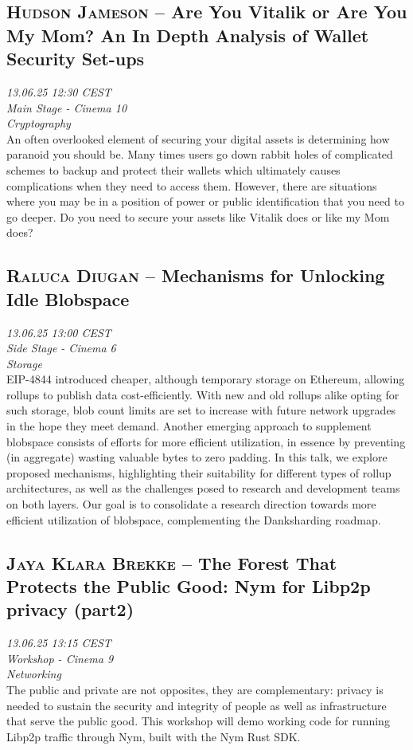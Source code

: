 \subsection {\textsc{Hudson Jameson}  -- Are You Vitalik or Are You My Mom? An In Depth Analysis of Wallet Security Set-ups} \noindent \textit {13.06.25 12:30 CEST\\ Main Stage - Cinema 10\\ Cryptography}\\[1em] An often overlooked element of securing your digital assets is determining how paranoid you should be. Many times users go down rabbit holes of complicated schemes to backup and protect their wallets which ultimately causes complications when they need to access them. However, there are situations where you may be in a position of power or public identification that you need to go deeper. Do you need to secure your assets like Vitalik does or like my Mom does?

\clearpage
\subsection {\textsc{Raluca Diugan}  -- Mechanisms for Unlocking Idle Blobspace} \noindent \textit {13.06.25 13:00 CEST\\ Side Stage - Cinema 6\\ Storage}\\[1em] EIP-4844 introduced cheaper, although temporary storage on Ethereum, allowing rollups to publish data cost-efficiently. With new and old rollups alike opting for such storage, blob count limits are set to increase with future network upgrades in the hope they meet demand. Another emerging approach to supplement blobspace consists of efforts for more efficient utilization, in essence by preventing (in aggregate) wasting valuable bytes to zero padding. In this talk, we explore proposed mechanisms, highlighting their suitability for different types of rollup architectures, as well as the challenges posed to research and development teams on both layers. Our goal is to consolidate a research direction towards more efficient utilization of blobspace, complementing the Danksharding roadmap.

\clearpage
\subsection {\textsc{Jaya Klara Brekke}  -- The Forest That Protects the Public Good: Nym for Libp2p privacy (part2)} \noindent \textit {13.06.25 13:15 CEST\\ Workshop - Cinema 9\\ Networking}\\[1em] The public and private are not opposites, they are complementary: privacy is needed to sustain the security and integrity of people as well as infrastructure that serve the public good. This workshop will demo working code for running Libp2p traffic through Nym, built with the Nym Rust SDK.

